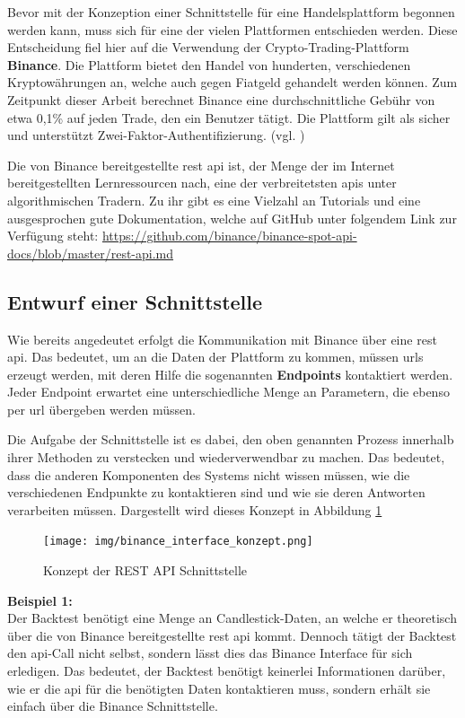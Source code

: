 \documentclass[oneside]{ausarbeitung}
\begin{document}
Bevor mit der Konzeption einer Schnittstelle für eine Handelsplattform begonnen werden kann, muss sich für eine der vielen Plattformen entschieden werden. Diese Entscheidung fiel hier auf die Verwendung der Crypto-Trading-Plattform \textbf{Binance}. Die Plattform bietet den Handel von hunderten, verschiedenen Kryptowährungen an, welche auch gegen Fiatgeld gehandelt werden können. Zum Zeitpunkt dieser Arbeit berechnet Binance eine durchschnittliche Gebühr von etwa 0,1\% auf jeden Trade, den ein Benutzer tätigt. Die Plattform gilt als sicher
und unterstützt Zwei-Faktor-Authentifizierung. (vgl. \cite{binance})

Die von Binance bereitgestellte \ac{rest} \ac{api} ist, der Menge der im Internet bereitgestellten Lernressourcen nach, eine der verbreitetsten \ac{api}s unter algorithmischen Tradern. Zu ihr gibt es eine Vielzahl an Tutorials und eine ausgesprochen gute Dokumentation, welche auf GitHub unter folgendem Link zur Verfügung steht: \url{https://github.com/binance/binance-spot-api-docs/blob/master/rest-api.md}

\subsection{Entwurf einer Schnittstelle}
\label{sub:entwurf_einer_schnittstelle}

Wie bereits angedeutet erfolgt die Kommunikation mit Binance über eine \ac{rest} \ac{api}. Das bedeutet, um an die Daten der Plattform zu kommen, müssen \ac{url}s erzeugt werden, mit deren Hilfe die sogenannten \textbf{Endpoints} kontaktiert werden. Jeder Endpoint erwartet eine unterschiedliche Menge an Parametern, die ebenso per \ac{url} übergeben werden müssen.

Die Aufgabe der Schnittstelle ist es dabei, den oben genannten Prozess innerhalb ihrer Methoden zu verstecken und wiederverwendbar zu machen. Das bedeutet, dass die anderen Komponenten des Systems nicht wissen müssen, wie die verschiedenen Endpunkte zu kontaktieren sind und wie sie deren Antworten verarbeiten müssen. Dargestellt wird dieses Konzept in Abbildung \ref{fig:9}

\begin{figure}[H]
  \centering
  \texttt{[image: img/binance\_interface\_konzept.png]}
  \caption{Konzept der REST API Schnittstelle}
  \label{fig:9}
\end{figure}

\textbf{Beispiel 1:} \\
Der Backtest benötigt eine Menge an Candlestick-Daten, an welche er theoretisch über die von Binance bereitgestellte \ac{rest} \ac{api} kommt. Dennoch tätigt der Backtest den \ac{api}-Call nicht selbst, sondern lässt dies das Binance Interface für sich erledigen. Das bedeutet, der Backtest benötigt keinerlei Informationen darüber, wie er die \ac{api} für die benötigten Daten kontaktieren muss, sondern erhält sie einfach über die Binance Schnittstelle.
\end{document}
